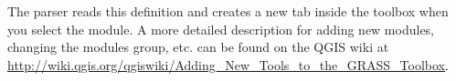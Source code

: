 The parser reads this definition and creates a new tab inside the toolbox
when you select the module. A more detailed description for adding new
modules, changing the modules group, etc. can be found on the QGIS wiki at \\
\url{http://wiki.qgis.org/qgiswiki/Adding\_New\_Tools\_to\_the\_GRASS\_Toolbox}.

\FloatBarrier
